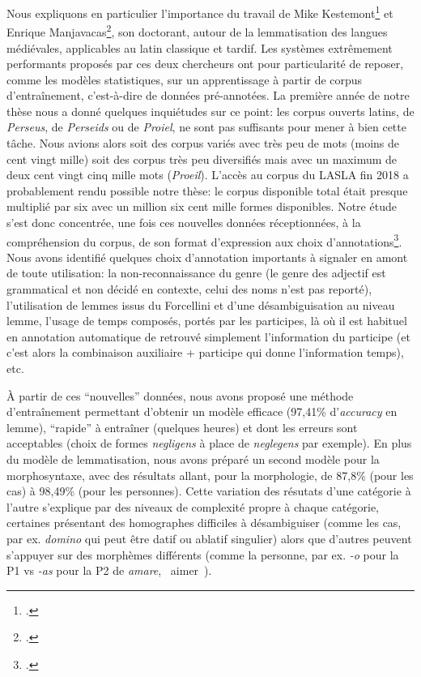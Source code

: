 Nous expliquons en particulier l'importance du travail de Mike Kestemont\footcite{kestemont_lemmatization_2017} et Enrique Manjavacas\footcite{manjavacas_improving_2019}, son doctorant, autour de la lemmatisation des langues médiévales, applicables au latin classique et tardif. Les systèmes extrêmement performants proposés par ces deux chercheurs ont pour particularité de reposer, comme les modèles statistiques, sur un apprentissage à partir de corpus d'entraînement, c'est-à-dire de données pré-annotées. La première année de notre thèse nous a donné quelques inquiétudes sur ce point: les corpus ouverts latins, de \textit{Perseus}, de \textit{Perseids} ou de \textit{Proiel}, ne sont pas suffisants pour mener à bien cette tâche. Nous avions alors soit des corpus variés avec très peu de mots (moins de cent vingt mille) soit des corpus très peu diversifiés mais avec un maximum de deux cent vingt cinq mille mots (\textit{Proeil}). L'accès au corpus du LASLA fin 2018 a probablement rendu possible notre thèse: le corpus disponible total était presque multiplié par six avec un million six cent mille formes disponibles. Notre étude s'est donc concentrée, une fois ces nouvelles données réceptionnées, à la compréhension du corpus, de son format d'expression aux choix d'annotations\footcite{BodsonCodification1966}. Nous avons identifié quelques choix d'annotation importants à signaler en amont de toute utilisation: la non-reconnaissance du genre (le genre des adjectif est grammatical et non décidé en contexte, celui des noms n'est pas reporté), l'utilisation de lemmes issus du Forcellini et d'une désambiguisation au niveau lemme, l'usage de temps composés, portés par les participes, là où il est habituel en annotation automatique de retrouvé simplement l'information du participe (et c'est alors la combinaison auxiliaire + participe qui donne l'information temps), etc.

À partir de ces \enquote{nouvelles} données, nous avons proposé une méthode d'entraînement permettant d'obtenir un modèle efficace (97,41\% d'\textit{accuracy} en lemme), \enquote{rapide} à entraîner (quelques heures) et dont les erreurs sont acceptables (choix de formes \textit{negligens} à place de \textit{neglegens} par exemple). En plus du modèle de lemmatisation, nous avons préparé un second modèle pour la morphosyntaxe, avec des résultats allant, pour la morphologie, de 87,8\% (pour les cas) à 98,49\% (pour les personnes). Cette variation des résutats d'une catégorie à l'autre s'explique par des niveaux de complexité propre à chaque catégorie, certaines présentant des homographes difficiles à désambiguiser (comme les cas, par ex. \textit{domino} qui peut être datif ou ablatif singulier) alors que d'autres peuvent s'appuyer sur des morphèmes différents (comme la personne, par ex. \textit{-o} pour la P1 vs \textit{-as} pour la P2 de \textit{amare}, \og~aimer~\fg{}).

